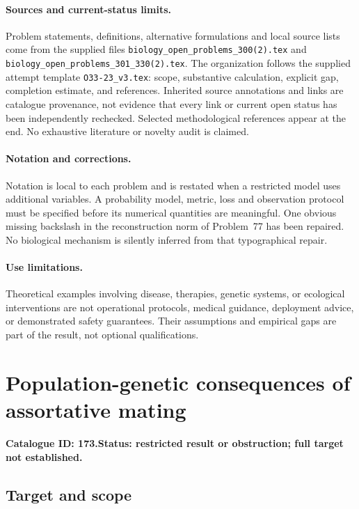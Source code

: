 \documentclass[11pt]{article}
\begin{document}
\paragraph{Sources and current-status limits.}
Problem statements, definitions, alternative formulations and local source lists
come from the supplied files
\texttt{biology\_open\_problems\_300(2).tex} and
\texttt{biology\_open\_problems\_301\_330(2).tex}.
The organization follows the supplied attempt template
\texttt{O33-23\_v3.tex}: scope, substantive calculation, explicit gap,
completion estimate, and references. Inherited source annotations and links are
catalogue provenance, not evidence that every link or current open status has
been independently rechecked. Selected methodological references appear at the
end. No exhaustive literature or novelty audit is claimed.

\paragraph{Notation and corrections.}
Notation is local to each problem and is restated when a restricted model uses
additional variables. A probability model, metric, loss and observation protocol
must be specified before its numerical quantities are meaningful. One obvious
missing backslash in the reconstruction norm of Problem~77 has been repaired.
No biological mechanism is silently inferred from that typographical repair.

\paragraph{Use limitations.}
Theoretical examples involving disease, therapies, genetic systems, or ecological
interventions are not operational protocols, medical guidance, deployment advice,
or demonstrated safety guarantees. Their assumptions and empirical gaps are part
of the result, not optional qualifications.

\setcounter{section}{172}
\section{Population-genetic consequences of assortative mating}
\label{prob:173}
\noindent\textbf{Catalogue ID: 173.}\quad \textbf{Status: restricted result or obstruction; full target not established.}
\subsection{Target and scope}
\end{document}
